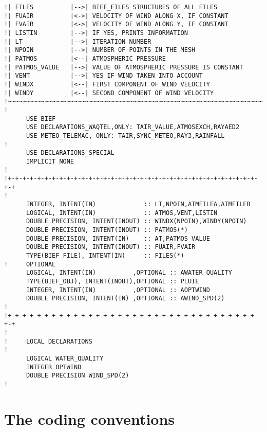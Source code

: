 \begin{lstlisting}
!| FILES          |-->| BIEF_FILES STRUCTURES OF ALL FILES
!| FUAIR          |<->| VELOCITY OF WIND ALONG X, IF CONSTANT
!| FVAIR          |<->| VELOCITY OF WIND ALONG Y, IF CONSTANT
!| LISTIN         |-->| IF YES, PRINTS INFORMATION
!| LT             |-->| ITERATION NUMBER
!| NPOIN          |-->| NUMBER OF POINTS IN THE MESH
!| PATMOS         |<--| ATMOSPHERIC PRESSURE
!| PATMOS_VALUE   |-->| VALUE OF ATMOSPHERIC PRESSURE IS CONSTANT
!| VENT           |-->| YES IF WIND TAKEN INTO ACCOUNT
!| WINDX          |<--| FIRST COMPONENT OF WIND VELOCITY
!| WINDY          |<--| SECOND COMPONENT OF WIND VELOCITY
!~~~~~~~~~~~~~~~~~~~~~~~~~~~~~~~~~~~~~~~~~~~~~~~~~~~~~~~~~~~~~~~~~~~~~~~
!
      USE BIEF
      USE DECLARATIONS_WAQTEL,ONLY: TAIR_VALUE,ATMOSEXCH,RAYAED2
      USE METEO_TELEMAC, ONLY: TAIR,SYNC_METEO,RAY3,RAINFALL
!
      USE DECLARATIONS_SPECIAL
      IMPLICIT NONE
!
!+-+-+-+-+-+-+-+-+-+-+-+-+-+-+-+-+-+-+-+-+-+-+-+-+-+-+-+-+-+-+-+-+-+-+-+
!
      INTEGER, INTENT(IN)             :: LT,NPOIN,ATMFILEA,ATMFILEB
      LOGICAL, INTENT(IN)             :: ATMOS,VENT,LISTIN
      DOUBLE PRECISION, INTENT(INOUT) :: WINDX(NPOIN),WINDY(NPOIN)
      DOUBLE PRECISION, INTENT(INOUT) :: PATMOS(*)
      DOUBLE PRECISION, INTENT(IN)    :: AT,PATMOS_VALUE
      DOUBLE PRECISION, INTENT(INOUT) :: FUAIR,FVAIR
      TYPE(BIEF_FILE), INTENT(IN)     :: FILES(*)
!     OPTIONAL
      LOGICAL, INTENT(IN)          ,OPTIONAL :: AWATER_QUALITY
      TYPE(BIEF_OBJ), INTENT(INOUT),OPTIONAL :: PLUIE
      INTEGER, INTENT(IN)          ,OPTIONAL :: AOPTWIND
      DOUBLE PRECISION, INTENT(IN) ,OPTIONAL :: AWIND_SPD(2)
!
!+-+-+-+-+-+-+-+-+-+-+-+-+-+-+-+-+-+-+-+-+-+-+-+-+-+-+-+-+-+-+-+-+-+-+-+
!
!     LOCAL DECLARATIONS
!
      LOGICAL WATER_QUALITY
      INTEGER OPTWIND
      DOUBLE PRECISION WIND_SPD(2)
!
\end{lstlisting}

\section{The coding conventions}

